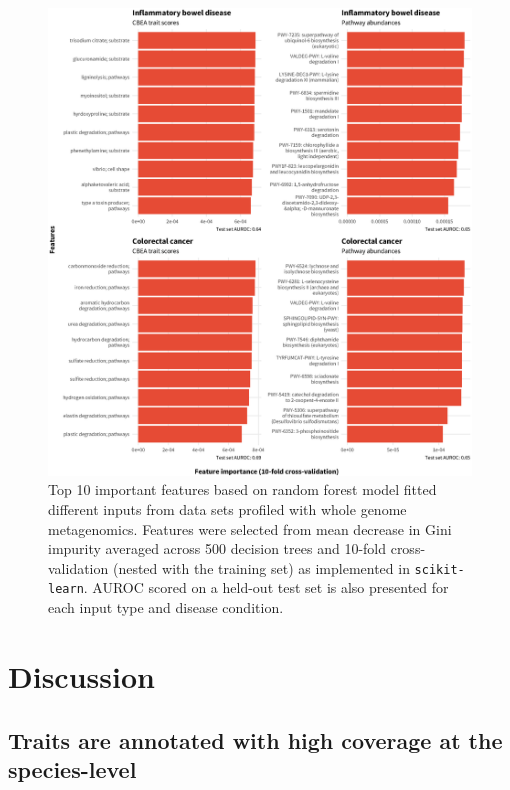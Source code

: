 \begin{figure}[!h]
\includegraphics[width=0.99\linewidth]{figures/ch4_f4.eps}
\caption[Top 10 important features based on random forest model fitted different inputs from data sets profiled with whole genome metagenomics]{Top 10 important features based on random forest model fitted different inputs from data sets profiled with whole genome metagenomics. Features were selected from mean decrease in Gini impurity averaged across 500 decision trees and 10-fold cross-validation (nested with the training set) as implemented in \texttt{scikit-learn}. AUROC scored on a held-out test set is also presented for each input type and disease condition.}
\label{fig:4.4}
\end{figure}

\section*{Discussion}
\subsection*{Traits are annotated with high coverage at the species-level}


